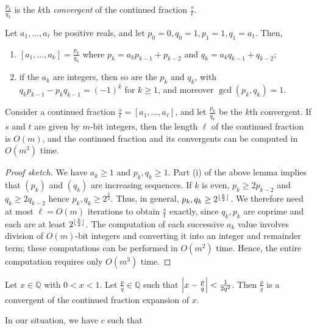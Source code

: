 \( \frac{p_k}{q_k} \) is the \( k \)th \emph{convergent} of the continued fraction \( \frac{s}{t} \).
\begin{lemma}
    Let \( a_1, \dots, a_\ell \) be positive reals, and let \( p_0 = 0, q_0 = 1, p_1 = 1, q_1 = a_1 \).
    Then,
    \begin{enumerate}
        \item \( [a_1, \dots, a_k] = \frac{p_k}{q_k} \) where \( p_k = a_k p_{k-1} + p_{k-2} \) and \( q_k = a_k q_{k-1} + q_{k-2} \);
        \item if the \( a_k \) are integers, then so are the \( p_k \) and \( q_k \), with \( q_k p_{k-1} - p_k q_{k-1} = (-1)^k \) for \( k \geq 1 \), and moreover \( \gcd(p_k, q_k) = 1 \).
    \end{enumerate}
\end{lemma}
\begin{theorem}
    Consider a continued fraction \( \frac{s}{t} = [a_1, \dots, a_\ell] \), and let \( \frac{p_k}{q_k} \) be the \( k \)th convergent.
    If \( s \) and \( t \) are given by \( m \)-bit integers, then the length \( \ell \) of the continued fraction is \( O(m) \), and the continued fraction and its convergents can be computed in \( O(m^3) \) time.
\end{theorem}
\begin{proof}[Proof sketch]
    We have \( a_k \geq 1 \) and \( p_k, q_k \geq 1 \).
    Part (i) of the above lemma implies that \( (p_k) \) and \( (q_k) \) are increasing sequences.
    If \( k \) is even, \( p_k \geq 2p_{k-2} \) and \( q_k \geq 2q_{k-2} \) hence \( p_k, q_k \geq 2^{\frac{k}{2}} \).
    Thus, in general, \( p_k, q_k \geq 2^{\lfloor\frac{k}{2}\rfloor} \).
    We therefore need at most \( \ell = O(m) \) iterations to obtain \( \frac{s}{t} \) exactly, since \( q_k, p_k \) are coprime and each are at least \( 2^{\lfloor\frac{k}{2}\rfloor} \).
    The computation of each successive \( a_k \) value involves division of \( O(m) \)-bit integers and converting it into an integer and remainder term; these computations can be performed in \( O(m^2) \) time.
    Hence, the entire computation requires only \( O(m^3) \) time.
\end{proof}
\begin{theorem}
    Let \( x \in \mathbb Q \) with \( 0 < x < 1 \).
    Let \( \frac{p}{q} \in \mathbb Q \) such that \( \abs{x - \frac{p}{q}} < \frac{1}{2q^2} \).
    Then \( \frac{p}{q} \) is a convergent of the continued fraction expansion of \( x \).
\end{theorem}
In our situation, we have \( c \) such that
